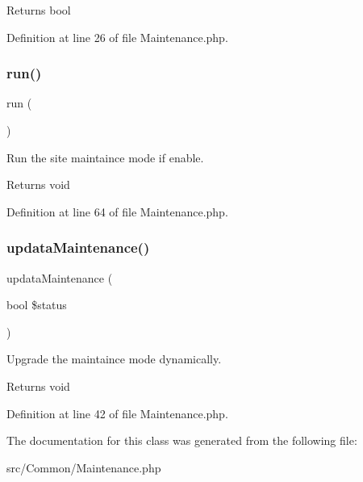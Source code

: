 \begin{DoxyReturn}{Returns}
bool 
\end{DoxyReturn}


Definition at line 26 of file Maintenance.\+php.

\mbox{\label{class_zest_1_1_common_1_1_maintenance_afb0fafe7e02a3ae1993c01c19fad2bae}} 
\subsubsection{\texorpdfstring{run()}{run()}}
{\footnotesize\ttfamily run (\begin{DoxyParamCaption}{ }\end{DoxyParamCaption})}

Run the site maintaince mode if enable.

\begin{DoxyReturn}{Returns}
void 
\end{DoxyReturn}


Definition at line 64 of file Maintenance.\+php.

\mbox{\label{class_zest_1_1_common_1_1_maintenance_aa25742bbd32a677faffc95f3d7ccaf35}} 
\subsubsection{\texorpdfstring{updata\+Maintenance()}{updataMaintenance()}}
{\footnotesize\ttfamily updata\+Maintenance (\begin{DoxyParamCaption}\item[{bool}]{\$status }\end{DoxyParamCaption})}

Upgrade the maintaince mode dynamically.

\begin{DoxyReturn}{Returns}
void 
\end{DoxyReturn}


Definition at line 42 of file Maintenance.\+php.



The documentation for this class was generated from the following file\+:\begin{DoxyCompactItemize}
\item 
src/\+Common/Maintenance.\+php\end{DoxyCompactItemize}
